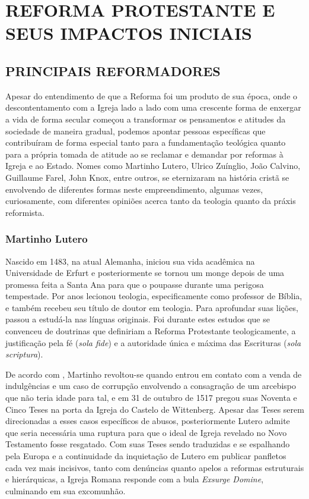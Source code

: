 \documentclass[
    article,            %
	12pt,				%
	oneside,			%
	a4paper,			%
	chapter=TITLE,		%
	section=TITLE,		%
	english,			%
	french,				%
	spanish,			%
	brazil				%
	]{abntex2}
\begin{document}
\section{REFORMA PROTESTANTE E SEUS IMPACTOS INICIAIS}

\subsection{PRINCIPAIS REFORMADORES}
Apesar do entendimento de que a Reforma foi um produto de sua época, onde o descontentamento com a Igreja lado a lado com uma crescente forma de enxergar a vida de forma secular começou a transformar os pensamentos e atitudes da sociedade de maneira gradual, podemos apontar pessoas específicas que contribuíram de forma especial tanto para a fundamentação teológica quanto para a própria tomada de atitude ao se reclamar e demandar por reformas à Igreja e ao Estado. Nomes como Martinho Lutero, Ulrico Zuínglio, João Calvino, Guillaume Farel, John Knox, entre outros, se eternizaram na história cristã se envolvendo de diferentes formas neste empreendimento, algumas vezes, curiosamente, com diferentes opiniões acerca tanto da teologia quanto da práxis reformista.

\subsubsection{Martinho Lutero}
Nascido em 1483, na atual Alemanha, iniciou sua vida acadêmica na Universidade de Erfurt e posteriormente se tornou um monge depois de uma promessa feita a Santa Ana para que o poupasse durante uma perigosa tempestade. Por anos lecionou teologia, especificamente como professor de Bíblia, e também recebeu seu título de doutor em teologia. Para aprofundar suas lições, passou a estudá-la nas línguas originais. Foi durante estes estudos que se convenceu de doutrinas que definiriam a Reforma Protestante teologicamente, a justificação pela fé (\emph{sola fide}) e a autoridade única e máxima das Escrituras (\emph{sola scriptura}).

De acordo com , Martinho revoltou-se quando entrou em contato com a venda de indulgências e um caso de corrupção envolvendo a consagração de um arcebispo que não teria idade para tal, e em 31 de outubro de 1517 pregou suas Noventa e Cinco Teses na porta da Igreja do Castelo de Wittenberg. Apesar das Teses serem direcionadas a esses casos específicos de abusos, posteriormente Lutero admite que seria necessária uma ruptura para que o ideal de Igreja revelado no Novo Testamento fosse resgatado. Com suas Teses sendo traduzidas e se espalhando pela Europa e a continuidade da inquietação de Lutero em publicar panfletos cada vez mais incisivos, tanto com denúncias quanto apelos a reformas estruturais e hierárquicas, a Igreja Romana responde com a bula \emph{Exsurge Domine}, culminando em sua excomunhão.
\end{document}
